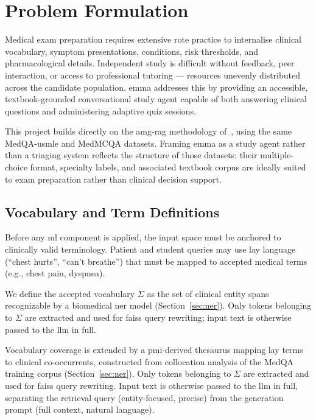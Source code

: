 \section{Problem Formulation}
\label{sec:problem}

Medical exam preparation requires extensive rote practice to internalise clinical vocabulary, symptom presentations, conditions, risk thresholds, and pharmacological details. Independent study is difficult without feedback, peer interaction, or access to professional tutoring --- resources unevenly distributed across the candidate population. \gls{emma} addresses this by providing an accessible, textbook-grounded conversational study agent capable of both answering clinical questions and administering adaptive quiz sessions.

This project builds directly on the \gls{amg-rag} methodology of~\citet{rezaei_agentic_2025}, using the same MedQA-\gls{usmle} and MedMCQA datasets. Framing \gls{emma} as a study agent rather than a triaging system reflects the structure of those datasets: their multiple-choice format, specialty labels, and associated textbook corpus are ideally suited to exam preparation rather than clinical decision support.

\subsection{Vocabulary and Term Definitions}

Before any \gls{ml} component is applied, the input space must be anchored to clinically valid terminology. Patient and student queries may use lay language (``chest hurts'', ``can't breathe'') that must be mapped to accepted medical terms (e.g., chest pain, dyspnea).

We define the accepted vocabulary $\Sigma$ as the set of clinical entity spans recognizable by a biomedical \gls{ner} model (Section~\ref{sec:ner}). Only tokens belonging to $\Sigma$ are extracted and used for \gls{faiss} query rewriting; input text is otherwise passed to the \gls{llm} in full.

Vocabulary coverage is extended by a \gls{pmi}-derived thesaurus mapping lay terms to clinical co-occurrents, constructed from collocation analysis of the MedQA training corpus (Section~\ref{sec:ner}). Only tokens belonging to $\Sigma$ are extracted and used for \gls{faiss} query rewriting. Input text is otherwise passed to the \gls{llm} in full, separating the retrieval query (entity-focused, precise) from the generation prompt (full context, natural language).

